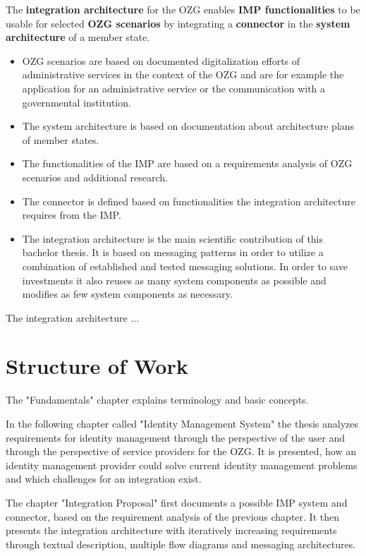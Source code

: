 \documentclass[
     12pt,         %
     a4paper,      %
     BCOR=10mm,version=first,     %
     DIV=14,version=first,        %
     ]{scrreprt}
\begin{document}
The \textbf{integration architecture} for the OZG enables \textbf{IMP functionalities} to be usable for selected \textbf{OZG scenarios} by integrating a \textbf{connector} in the \textbf{system architecture} of a member state.

\begin{itemize}
    \item OZG scenarios are based on documented digitalization efforts of administrative services in the context of the OZG and are for example the application for an administrative service or the communication with a governmental institution.
    \item The system architecture is based on documentation about architecture plans of member states.
    \item The functionalities of the IMP are based on a requirements analysis of OZG scenarios and additional research.
    \item The connector is defined based on functionalities the integration architecture requires from the IMP.
    \item The integration architecture is the main scientific contribution of this bachelor thesis. It is based on messaging patterns in order to utilize a combination of established and tested messaging solutions. In order to save investments it also reuses as many system components as possible and modifies as few system components as necessary.
\end{itemize}

The integration architecture ...

\chapter{Structure of Work}
The "Fundamentals" chapter explains terminology and basic concepts.

In the following chapter called "Identity Management System" the thesis analyzes requirements for identity management through the perspective of the user and through the perspective of service providers for the OZG. It is presented, how an identity management provider could solve current identity management problems and which challenges for an integration exist.

The chapter "Integration Proposal" first documents a possible IMP system and connector, based on the requirement analysis of the previous chapter. It then presents the integration architecture with iteratively increasing requirements through textual description, multiple flow diagrams and messaging architectures.
\end{document}
